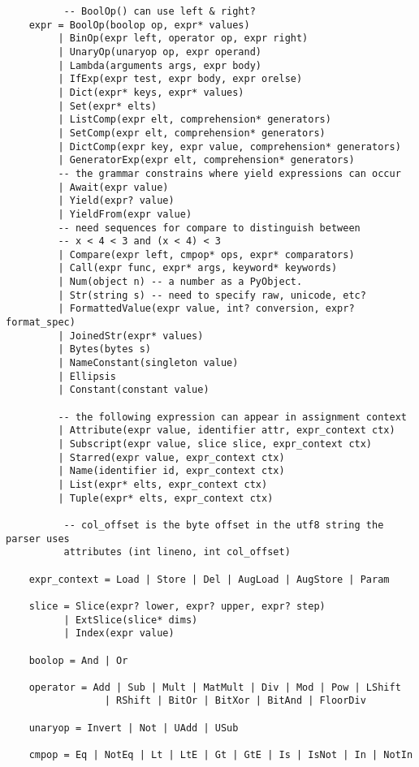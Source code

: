 \begin{verbatim}
          -- BoolOp() can use left & right?
    expr = BoolOp(boolop op, expr* values)
         | BinOp(expr left, operator op, expr right)
         | UnaryOp(unaryop op, expr operand)
         | Lambda(arguments args, expr body)
         | IfExp(expr test, expr body, expr orelse)
         | Dict(expr* keys, expr* values)
         | Set(expr* elts)
         | ListComp(expr elt, comprehension* generators)
         | SetComp(expr elt, comprehension* generators)
         | DictComp(expr key, expr value, comprehension* generators)
         | GeneratorExp(expr elt, comprehension* generators)
         -- the grammar constrains where yield expressions can occur
         | Await(expr value)
         | Yield(expr? value)
         | YieldFrom(expr value)
         -- need sequences for compare to distinguish between
         -- x < 4 < 3 and (x < 4) < 3
         | Compare(expr left, cmpop* ops, expr* comparators)
         | Call(expr func, expr* args, keyword* keywords)
         | Num(object n) -- a number as a PyObject.
         | Str(string s) -- need to specify raw, unicode, etc?
         | FormattedValue(expr value, int? conversion, expr? format_spec)
         | JoinedStr(expr* values)
         | Bytes(bytes s)
         | NameConstant(singleton value)
         | Ellipsis
         | Constant(constant value)

         -- the following expression can appear in assignment context
         | Attribute(expr value, identifier attr, expr_context ctx)
         | Subscript(expr value, slice slice, expr_context ctx)
         | Starred(expr value, expr_context ctx)
         | Name(identifier id, expr_context ctx)
         | List(expr* elts, expr_context ctx)
         | Tuple(expr* elts, expr_context ctx)

          -- col_offset is the byte offset in the utf8 string the parser uses
          attributes (int lineno, int col_offset)

    expr_context = Load | Store | Del | AugLoad | AugStore | Param

    slice = Slice(expr? lower, expr? upper, expr? step)
          | ExtSlice(slice* dims)
          | Index(expr value)

    boolop = And | Or

    operator = Add | Sub | Mult | MatMult | Div | Mod | Pow | LShift
                 | RShift | BitOr | BitXor | BitAnd | FloorDiv

    unaryop = Invert | Not | UAdd | USub

    cmpop = Eq | NotEq | Lt | LtE | Gt | GtE | Is | IsNot | In | NotIn


\end{verbatim}
